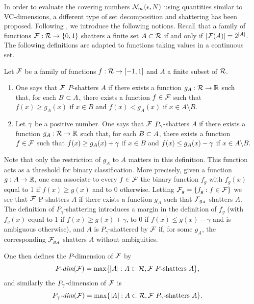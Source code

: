 In order to evaluate the covering numbers ${\mathcal N}_\infty(\epsilon, N)$ using quantities similar to  VC-dimensions, a different type of set decomposition and shattering has been proposed. Following \citet{alon1997scale}, we introduce the following notions. Recall that a family of functions ${\mathcal F}: {\mathcal R} \to \{0,1\}$ shatters a finite set $A\subset{\mathcal R}$ if and only if $|{\mathcal F}(A)| = 2^{|A|}$. The following definitions are adapted to functions taking values in a continuous set.  
\begin{definition}
\label{def:all.shatter}
Let ${\mathcal F}$ be a family of functions $f:{\mathcal R}\to [-1,1]$ and $A$ a finite subset of ${\mathcal R}$. 
\begin{enumerate}[label=(\roman*)]
\item One says that ${\mathcal F}$ $P$-shatters $A$ if there exists a function $g_A:{\mathcal R}\to {\mathbb{R}}$ such that, for each $B\subset A$, there exists a  function $f\in {\mathcal F}$ such that $f(x) \geq g_A(x)$ if $x\in B$ and $f(x) < g_A(x)$ if $x\in A\setminus B$.
\item Let $\gamma$ be a positive number. One says that ${\mathcal F}$ $P_\gamma$-shatters $A$ if there exists a function $g_A:{\mathcal R}\to {\mathbb{R}}$ such that, for each $B\subset A$, there exists a  function $f\in {\mathcal F}$ such that $f(x) \geq g_A(x)+\gamma$ if $x\in B$ and $f(x) \leq g_A(x)-\gamma$ if $x\in A\setminus B$.
\end{enumerate}
\end{definition}
Note that only the restriction of $g_A$ to $A$ matters in this definition.
This function acts as a threshold for binary classification. More precisely, given a function $g: A \to {\mathbb{R}}$, one can associate to every $f\in {\mathcal F}$ the binary function $f_g$ with $f_g(x)$ equal to 1 if $f(x) \geq g(x)$ and to 0 otherwise. Letting ${\mathcal F}_g = \{f_g: f\in {\mathcal F}\}$ we see that ${\mathcal F}$ P-shatters $A$ if there exists a function $g_A$ such that ${\mathcal F}_{g_A}$ shatters $A$. The definition of $P_\gamma$-shattering introduces a margin in the definition of $f_g$ (with $f_g(x)$ equal to 1 if $f(x) \geq g(x)+\gamma$, to 0 if $f(x) \leq g(x)-\gamma$ and is ambiguous otherwise), and $A$ is $P_\gamma$-shattered by ${\mathcal F}$ if, for some $g_A$, the corresponding ${\mathcal F}_{g_A}$ shatters $A$ without ambiguities.  

\begin{definition}
\label{def:P.dim}
One then defines the $P$-dimension of ${\mathcal F}$ by
\[
\Pdim(\CF) = \max\{|A|: A\sub \CR, \CF\ P\text{-shatters } A\},
\]
and similarly the $P_\gamma$-dimension of ${\mathcal F}$ is
\[
\Pdim[\ga](\CF) = \max\{|A|: A\sub \CR, \CF\ P_\ga\text{-shatters } A\}.
\]
\end{definition}

